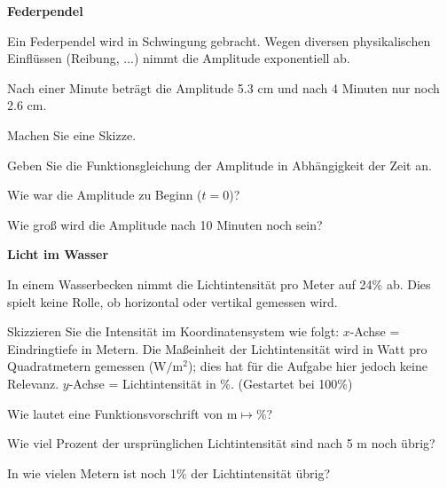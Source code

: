 

\bbwActAufgabenNr{} \textbf{Federpendel}

Ein Federpendel wird in Schwingung gebracht. Wegen diversen
physikalischen Einflüssen (Reibung, ...) nimmt die Amplitude
exponentiell ab.

Nach einer Minute beträgt die Amplitude 5.3 cm und nach 4 Minuten nur noch
2.6 cm.

\begin{bbwAufgabenBlock}

\item Machen Sie eine Skizze.
\item Geben Sie die Funktionsgleichung der Amplitude in Abhängigkeit
der Zeit an.
      
\item Wie war die Amplitude zu Beginn ($t=0$)?

\item Wie groß wird die Amplitude nach 10 Minuten noch sein?
\end{bbwAufgabenBlock}
\platzFuerBerechnungenBisEndeSeite{}





\bbwActAufgabenNr{} \textbf{Licht im Wasser}

In einem Wasserbecken nimmt die Lichtintensität pro Meter auf 24\% ab.
Dies spielt keine Rolle, ob horizontal oder vertikal gemessen wird.


\begin{bbwAufgabenBlock}

\item Skizzieren Sie die Intensität im Koordinatensystem wie folgt:
   $x$-Achse = Eindringtiefe in Metern. Die Maßeinheit der
   Lichtintensität wird in Watt pro Quadratmetern gemessen ($\textrm{W}/\textrm{m}^2$); dies
   hat für die Aufgabe hier jedoch keine Relevanz.
   $y$-Achse = Lichtintensität in \%. (Gestartet bei 100\%)
\item Wie lautet eine Funktionsvorschrift von $\textrm{m}\mapsto \%$?
\item Wie viel Prozent der ursprünglichen Lichtintensität sind nach 5
   m noch übrig? 

\item In wie vielen Metern ist noch 1\% der Lichtintensität übrig?
\end{bbwAufgabenBlock}
\platzFuerBerechnungenBisEndeSeite{}

